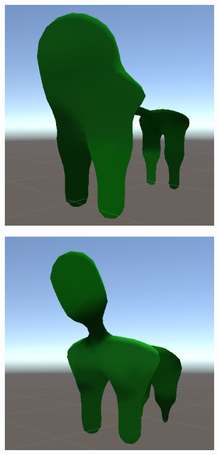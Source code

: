 \begin{figure}[ht]
    \centering
    \begin{subfigure}[b]{0.2\textwidth}
        \centering        
        \includegraphics[width=\textwidth, height=\textwidth]{resources/img/Finished_Creatures_4/creature_1}
    \end{subfigure}
    \begin{subfigure}[b]{0.2\textwidth}
        \centering
        \includegraphics[width=\textwidth, height=\textwidth]{resources/img/Finished_Creatures_4/creature_2}

\end{subfigure}
\end{figure}
